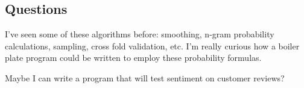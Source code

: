 \documentclass{article}
\begin{document}
\subsection{Questions}

I've seen some of these algorithms before: smoothing, n-gram probability calculations, sampling, cross fold validation, etc.
I'm really curious how a boiler plate program could be written to employ these probability formulas. \newline

Maybe I can write a program that will test sentiment on customer reviews?
\end{document}
